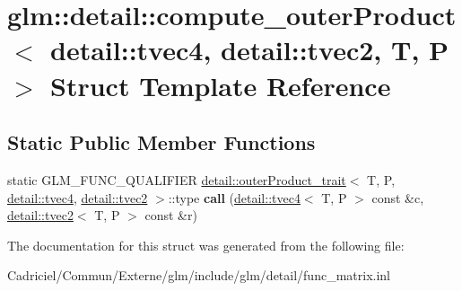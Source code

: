 \hypertarget{structglm_1_1detail_1_1compute__outer_product_3_01detail_1_1tvec4_00_01detail_1_1tvec2_00_01_t_00_01_p_01_4}{}\section{glm\+:\+:detail\+:\+:compute\+\_\+outer\+Product$<$ detail\+:\+:tvec4, detail\+:\+:tvec2, T, P $>$ Struct Template Reference}
\label{structglm_1_1detail_1_1compute__outer_product_3_01detail_1_1tvec4_00_01detail_1_1tvec2_00_01_t_00_01_p_01_4}
\subsection*{Static Public Member Functions}
\begin{DoxyCompactItemize}
\item 
static G\+L\+M\+\_\+\+F\+U\+N\+C\+\_\+\+Q\+U\+A\+L\+I\+F\+I\+ER \hyperlink{structglm_1_1detail_1_1outer_product__trait}{detail\+::outer\+Product\+\_\+trait}$<$ T, P, \hyperlink{structglm_1_1detail_1_1tvec4}{detail\+::tvec4}, \hyperlink{structglm_1_1detail_1_1tvec2}{detail\+::tvec2} $>$\+::type {\bfseries call} (\hyperlink{structglm_1_1detail_1_1tvec4}{detail\+::tvec4}$<$ T, P $>$ const \&c, \hyperlink{structglm_1_1detail_1_1tvec2}{detail\+::tvec2}$<$ T, P $>$ const \&r)\hypertarget{structglm_1_1detail_1_1compute__outer_product_3_01detail_1_1tvec4_00_01detail_1_1tvec2_00_01_t_00_01_p_01_4_a7ae9fc8b98d19655b6cb21fc1ff997b2}{}\label{structglm_1_1detail_1_1compute__outer_product_3_01detail_1_1tvec4_00_01detail_1_1tvec2_00_01_t_00_01_p_01_4_a7ae9fc8b98d19655b6cb21fc1ff997b2}

\end{DoxyCompactItemize}


The documentation for this struct was generated from the following file\+:\begin{DoxyCompactItemize}
\item 
Cadriciel/\+Commun/\+Externe/glm/include/glm/detail/func\+\_\+matrix.\+inl\end{DoxyCompactItemize}
